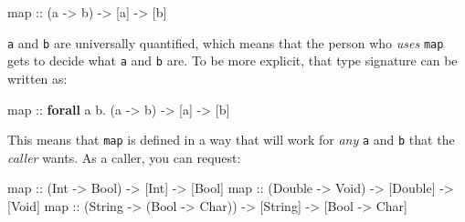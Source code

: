 \documentclass[]{article}
\newenvironment{Shaded}{}{}
\newcommand{\DataTypeTok}[1]{\textcolor[rgb]{0.56,0.13,0.00}{#1}}
\newcommand{\FunctionTok}[1]{\textcolor[rgb]{0.02,0.16,0.49}{#1}}
\newcommand{\KeywordTok}[1]{\textcolor[rgb]{0.00,0.44,0.13}{\textbf{#1}}}
\newcommand{\NormalTok}[1]{#1}
\newcommand{\OperatorTok}[1]{\textcolor[rgb]{0.40,0.40,0.40}{#1}}
\newcommand{\OtherTok}[1]{\textcolor[rgb]{0.00,0.44,0.13}{#1}}
\begin{document}
\begin{Shaded}
\begin{Highlighting}[]
\FunctionTok{map}\OtherTok{ ::}\NormalTok{ (a }\OtherTok{{-}\textgreater{}}\NormalTok{ b) }\OtherTok{{-}\textgreater{}}\NormalTok{ [a] }\OtherTok{{-}\textgreater{}}\NormalTok{ [b]}
\end{Highlighting}
\end{Shaded}

\texttt{a} and \texttt{b} are universally quantified, which means that the
person who \emph{uses} \texttt{map} gets to decide what \texttt{a} and
\texttt{b} are. To be more explicit, that type signature can be written as:

\begin{Shaded}
\begin{Highlighting}[]
\FunctionTok{map}\OtherTok{ ::} \KeywordTok{forall}\NormalTok{ a b}\OperatorTok{.}\NormalTok{ (a }\OtherTok{{-}\textgreater{}}\NormalTok{ b) }\OtherTok{{-}\textgreater{}}\NormalTok{ [a] }\OtherTok{{-}\textgreater{}}\NormalTok{ [b]}
\end{Highlighting}
\end{Shaded}

This means that \texttt{map} is defined in a way that will work for \emph{any}
\texttt{a} and \texttt{b} that the \emph{caller} wants. As a caller, you can
request:

\begin{Shaded}
\begin{Highlighting}[]
\FunctionTok{map}\OtherTok{ ::}\NormalTok{ (}\DataTypeTok{Int} \OtherTok{{-}\textgreater{}} \DataTypeTok{Bool}\NormalTok{)    }\OtherTok{{-}\textgreater{}}\NormalTok{ [}\DataTypeTok{Int}\NormalTok{]    }\OtherTok{{-}\textgreater{}}\NormalTok{ [}\DataTypeTok{Bool}\NormalTok{]}
\FunctionTok{map}\OtherTok{ ::}\NormalTok{ (}\DataTypeTok{Double} \OtherTok{{-}\textgreater{}} \DataTypeTok{Void}\NormalTok{) }\OtherTok{{-}\textgreater{}}\NormalTok{ [}\DataTypeTok{Double}\NormalTok{] }\OtherTok{{-}\textgreater{}}\NormalTok{ [}\DataTypeTok{Void}\NormalTok{]}
\FunctionTok{map}\OtherTok{ ::}\NormalTok{ (}\DataTypeTok{String} \OtherTok{{-}\textgreater{}}\NormalTok{ (}\DataTypeTok{Bool} \OtherTok{{-}\textgreater{}} \DataTypeTok{Char}\NormalTok{)) }\OtherTok{{-}\textgreater{}}\NormalTok{ [}\DataTypeTok{String}\NormalTok{] }\OtherTok{{-}\textgreater{}}\NormalTok{ [}\DataTypeTok{Bool} \OtherTok{{-}\textgreater{}} \DataTypeTok{Char}\NormalTok{]}
\end{Highlighting}
\end{Shaded}
\end{document}

